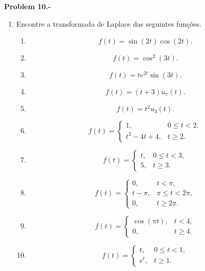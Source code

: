 \documentclass[10pt,a4paper]{amsart}
\begin{document}
\textbf{Problem 10.-}
\begin{enumerate}
    \item Encontre a transformada de Laplace das seguintes funções.

    \begin{enumerate}
        \item 
        \[
        f(t)=\sin(2t)\cos(2t).
        \]

        \item 
        \[
        f(t)=\cos^2(3t).
        \]

        \item 
        \[
        f(t)=t e^{2t}\sin(3t).
        \]

        \item 
        \[
        f(t)=(t+3)u_7(t).
        \]

        \item 
        \[
        f(t)=t^2u_3(t).
        \]

        \item 
        \[
        f(t)=
        \begin{cases}
        1, & 0\leq t<2,\\
        t^2-4t+4, & t\geq 2.
        \end{cases}
        \]

        \item 
        \[
        f(t)=
        \begin{cases}
        t, & 0\leq t<3,\\
        5, & t\geq 3.
        \end{cases}
        \]

        \item 
        \[
        f(t)=
        \begin{cases}
        0, & t<\pi,\\
        t-\pi, & \pi\leq t<2\pi,\\
        0, & t\geq 2\pi.
        \end{cases}
        \]

        \item 
        \[
        f(t)=
        \begin{cases}
        \cos(\pi t), & t<4,\\
        0, & t\geq 4.
        \end{cases}
        \]

        \item 
        \[
        f(t)=
        \begin{cases}
        t, & 0\leq t<1,\\
        e^t, & t\geq 1.
        \end{cases}
        \]
    \end{enumerate}


\end{enumerate}
\end{document}
